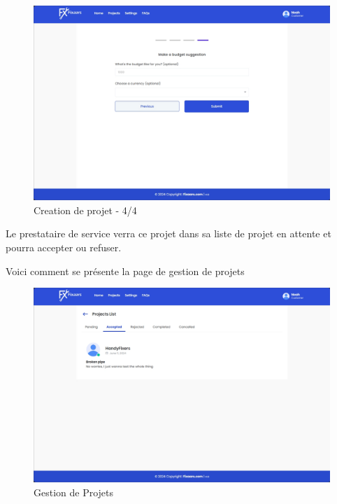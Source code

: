 \vspace{0.35cm}
\begin{figure}[H]
\begin{center}
\includegraphics[width=12cm]{assets/demo/setup-4.png}
\end{center}
\caption{Creation de projet - 4/4}
\end{figure}

Le prestataire de service verra ce projet dans sa liste de projet en attente et pourra accepter ou refuser. 

\vspace{0.35cm}

Voici comment se présente la page de gestion de projets 

\vspace{0.35cm}
\begin{figure}[H]
\begin{center}
\includegraphics[width=12cm]{assets/demo/pj-list.png}
\end{center}
\caption{Gestion de Projets}
\end{figure}

